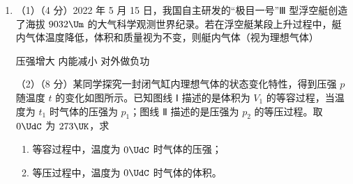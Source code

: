\documentclass[\gkver]{gaokaozhenti}
\begin{document}
\begin{enumerate}
{虫在 $x$ 轴上飞出的位置范围为

$\frac{1 - 2\sqrt 6}{3}H \le x \le 2H$

（3）设蛙的运动时间为 $t_{1}$，有

$\frac{1}{2}gt_{1}^{2} + \frac{1}{2}a_{y}(\sqrt 2 t_{1})^{2} = H$

$\frac{1}{2}gt_{2}^{2} + \frac{1}{2}a_{y}(\sqrt{17}t_{2})^{2} = H$

解得

$t_{1} = \sqrt{\frac{6H}{5g}}$，$t_{2} = \sqrt{\frac{3H}{10g}}$

而

$v_{1}t_{1} + \frac{1}{2}a_{x}(\sqrt 2 t_{1})^{2} = x_{1}$

$v_{1}t_{2} + \frac{1}{2}a_{x}(\sqrt{17}t_{2})^{2} = x_{1}$

解得

$v_{1} = \frac{1}{5}\sqrt{30gH}$，$x_{1} = \frac{26}{15}H$

而

$v_{1}t_{1} + \frac{1}{2}a_{x}(\sqrt 2 t_{1})^{2} = x_{2}$

$\frac{1}{2}a_{x}(\sqrt{17}t_{2})^{2} - v_{2}t_{2} = x_{2}$

解得

$v_{2} = \frac{1}{15}\sqrt{30gH}$，$x_{2} = \frac{14}{15}H$
}

\item
（1）（4 分）2022 年 5 月 15 日，我国自主研发的“极目一号”Ⅲ 型浮空艇创造了海拔 $9032\Um$ 的大气科学观测世界纪录。若在浮空艇某段上升过程中，艇内气体温度降低，体积和质量视为不变，则艇内气体（视为理想气体）

{压强增大}
{内能减小}
{对外做负功}

（2）（8 分）某同学探究一封闭气缸内理想气体的状态变化特性，得到压强 $p$ 随温度 $t$ 的变化如图所示。已知图线 Ⅰ 描述的是体积为 $V_{1}$ 的等容过程，当温度为 $t_{1}$ 时气体的压强为 $p_{1}$；图线 Ⅱ 描述的是压强为 $p_{2}$ 的等压过程。取 $0\UdC$ 为 $273\UK$，求
\begin{enumerate}
	\item
	等容过程中，温度为 $0\UdC$ 时气体的压强；
	\item
	等压过程中，温度为 $0\UdC$ 时气体的体积。
\end{enumerate}



\end{enumerate}
\end{document}
